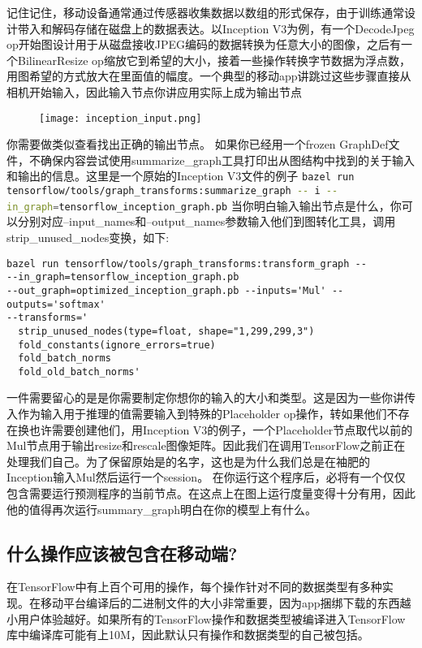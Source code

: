 记住记住，移动设备通常通过传感器收集数据以数组的形式保存，由于训练通常设计带入和解码存储在磁盘上的数据表达。以Inception V3为例，有一个DecodeJpeg op开始图设计用于从磁盘接收JPEG编码的数据转换为任意大小的图像，之后有一个BilinearResize op缩放它到希望的大小，接着一些操作转换字节数据为浮点数，用图希望的方式放大在里面值的幅度。一个典型的移动app讲跳过这些步骤直接从相机开始输入，因此输入节点你讲应用实际上成为输出节点
\begin{figure}[!h]
	\centering
	\texttt{[image: inception\_input.png]}
\end{figure}
你需要做类似查看找出正确的输出节点。
如果你已经用一个frozen GraphDef文件，不确保内容尝试使用summarize\_graph工具打印出从图结构中找到的关于输入和输出的信息。这里是一个原始的Inception V3文件的例子
\lstinline[language=Bash]{bazel run tensorflow/tools/graph_transforms:summarize_graph -- i --in_graph=tensorflow_inception_graph.pb}
当你明白输入输出节点是什么，你可以分别对应--input\_names和--output\_names参数输入他们到图转化工具，调用strip\_unused\_nodes变换，如下:
\begin{lstlisting}
bazel run tensorflow/tools/graph_transforms:transform_graph --
--in_graph=tensorflow_inception_graph.pb
--out_graph=optimized_inception_graph.pb --inputs='Mul' --outputs='softmax'
--transforms='
  strip_unused_nodes(type=float, shape="1,299,299,3")
  fold_constants(ignore_errors=true)
  fold_batch_norms
  fold_old_batch_norms'

\end{lstlisting}
一件需要留心的是是你需要制定你想你的输入的大小和类型。这是因为一些你讲传入作为输入用于推理的值需要输入到特殊的Placeholder op操作，转如果他们不存在换也许需要创建他们，用Inception V3的例子，一个Placeholder节点取代以前的Mul节点用于输出resize和rescale图像矩阵。因此我们在调用TensorFlow之前正在处理我们自己。为了保留原始是的名字，这也是为什么我们总是在袖肥的Inception输入Mul然后运行一个session。
在你运行这个程序后，必将有一个仅仅包含需要运行预测程序的当前节点。在这点上在图上运行度量变得十分有用，因此他的值得再次运行summary\_graph明白在你的模型上有什么。
\subsection{什么操作应该被包含在移动端?}
在TensorFlow中有上百个可用的操作，每个操作针对不同的数据类型有多种实现。在移动平台编译后的二进制文件的大小非常重要，因为app捆绑下载的东西越小用户体验越好。如果所有的TensorFlow操作和数据类型被编译进入TensorFlow库中编译库可能有上10M，因此默认只有操作和数据类型的自己被包括。

